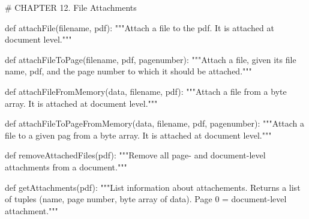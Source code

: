 # CHAPTER 12. File Attachments

def attachFile(filename, pdf):
    """Attach a file to the pdf. It is attached at document level."""

def attachFileToPage(filename, pdf, pagenumber):
    """Attach a file, given its file name, pdf, and the page number to which
    it should be attached."""

def attachFileFromMemory(data, filename, pdf):
    """Attach a file from a byte array. It is attached at document level."""

def attachFileToPageFromMemory(data, filename, pdf, pagenumber):
    """Attach a file to a given pag from a byte array. It is attached at
    document level."""

def removeAttachedFiles(pdf):
    """Remove all page- and document-level attachments from a document."""

def getAttachments(pdf):
    """List information about attachements. Returns a list of tuples (name,
    page number, byte array of data). Page 0 = document-level attachment."""
